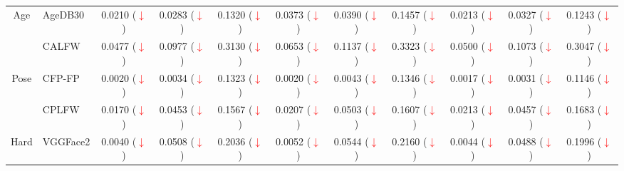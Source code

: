 \documentclass[class=report, crop=false, a4paper, 12pt]{standalone}
\begin{document}
\begin{table}[H]
{\begin{tabular}{cl|ccc|ccc|ccc|}
    \multicolumn{1}{|c|}{\multirow{2}{*}{Age}}     & AgeDB30  & \multicolumn{1}{c|}{0.0210 (\textcolor{red}{$\downarrow$})} & \multicolumn{1}{c|}{0.0283 (\textcolor{red}{$\downarrow$})} & 0.1320 (\textcolor{red}{$\downarrow$}) & \multicolumn{1}{c|}{0.0373 (\textcolor{red}{$\downarrow$})} & \multicolumn{1}{c|}{0.0390 (\textcolor{red}{$\downarrow$})} & 0.1457 (\textcolor{red}{$\downarrow$}) & \multicolumn{1}{c|}{0.0213 (\textcolor{red}{$\downarrow$})} & \multicolumn{1}{c|}{0.0327 (\textcolor{red}{$\downarrow$})} & 0.1243 (\textcolor{red}{$\downarrow$}) \\ \cline{2-11} 
    \multicolumn{1}{|c|}{}                         & CALFW    & \multicolumn{1}{c|}{0.0477 (\textcolor{red}{$\downarrow$})} & \multicolumn{1}{c|}{0.0977 (\textcolor{red}{$\downarrow$})} & 0.3130 (\textcolor{red}{$\downarrow$}) & \multicolumn{1}{c|}{0.0653 (\textcolor{red}{$\downarrow$})} & \multicolumn{1}{c|}{0.1137 (\textcolor{red}{$\downarrow$})} & 0.3323 (\textcolor{red}{$\downarrow$}) & \multicolumn{1}{c|}{0.0500 (\textcolor{red}{$\downarrow$})} & \multicolumn{1}{c|}{0.1073 (\textcolor{red}{$\downarrow$})} & 0.3047 (\textcolor{red}{$\downarrow$}) \\ \hline
    \multicolumn{1}{|c|}{\multirow{2}{*}{Pose}}    & CFP-FP   & \multicolumn{1}{c|}{0.0020 (\textcolor{red}{$\downarrow$})} & \multicolumn{1}{c|}{0.0034 (\textcolor{red}{$\downarrow$})} & 0.1323 (\textcolor{red}{$\downarrow$}) & \multicolumn{1}{c|}{0.0020 (\textcolor{red}{$\downarrow$})} & \multicolumn{1}{c|}{0.0043 (\textcolor{red}{$\downarrow$})} & 0.1346 (\textcolor{red}{$\downarrow$}) & \multicolumn{1}{c|}{0.0017 (\textcolor{red}{$\downarrow$})} & \multicolumn{1}{c|}{0.0031 (\textcolor{red}{$\downarrow$})} & 0.1146 (\textcolor{red}{$\downarrow$}) \\ \cline{2-11} 
    \multicolumn{1}{|c|}{}                         & CPLFW    & \multicolumn{1}{c|}{0.0170 (\textcolor{red}{$\downarrow$})} & \multicolumn{1}{c|}{0.0453 (\textcolor{red}{$\downarrow$})} & 0.1567 (\textcolor{red}{$\downarrow$}) & \multicolumn{1}{c|}{0.0207 (\textcolor{red}{$\downarrow$})} & \multicolumn{1}{c|}{0.0503 (\textcolor{red}{$\downarrow$})} & 0.1607 (\textcolor{red}{$\downarrow$}) & \multicolumn{1}{c|}{0.0213 (\textcolor{red}{$\downarrow$})} & \multicolumn{1}{c|}{0.0457 (\textcolor{red}{$\downarrow$})} & 0.1683 (\textcolor{red}{$\downarrow$}) \\ \hline
    \multicolumn{1}{|c|}{\multirow{2}{*}{Hard}}    & VGGFace2 & \multicolumn{1}{c|}{0.0040 (\textcolor{red}{$\downarrow$})} & \multicolumn{1}{c|}{0.0508 (\textcolor{red}{$\downarrow$})} & 0.2036 (\textcolor{red}{$\downarrow$}) & \multicolumn{1}{c|}{0.0052 (\textcolor{red}{$\downarrow$})} & \multicolumn{1}{c|}{0.0544 (\textcolor{red}{$\downarrow$})} & 0.2160 (\textcolor{red}{$\downarrow$}) & \multicolumn{1}{c|}{0.0044 (\textcolor{red}{$\downarrow$})} & \multicolumn{1}{c|}{0.0488 (\textcolor{red}{$\downarrow$})} & 0.1996 (\textcolor{red}{$\downarrow$}) \\ \cline{2-11} 

\end{tabular}}
\end{table}
\end{document}
